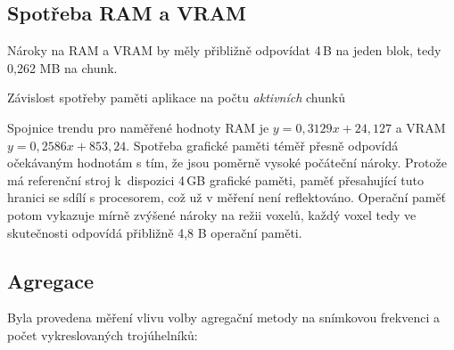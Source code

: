 \subsection{Spotřeba RAM a VRAM}
Nároky na RAM a VRAM by měly přibližně odpovídat 4\,B na jeden blok, tedy 0,262 MB na chunk.

\begin{graphFloat}[H]
	\caption{Závislost spotřeby paměti aplikace na počtu \textit{aktivních} chunků}
\end{graphFloat}

Spojnice trendu pro naměřené hodnoty RAM je $y = 0,3129x + 24,127$ a VRAM $y = 0,2586x + 853,24$. Spotřeba grafické paměti téměř přesně odpovídá očekávaným hodnotám s tím, že jsou poměrně vysoké počáteční nároky. Protože má referenční stroj k~dispozici 4\,GB grafické paměti, paměť přesahující tuto hranici se sdílí s procesorem, což už v měření není reflektováno. Operační paměť potom vykazuje mírně zvýšené nároky na režii voxelů, každý voxel tedy ve skutečnosti odpovídá přibližně 4,8 B operační paměti.

\pagebreak
\subsection{Agregace} \label{perf:aggregation}
Byla provedena měření vlivu volby agregační metody na snímkovou frekvenci a počet vykreslovaných trojúhelníků:

